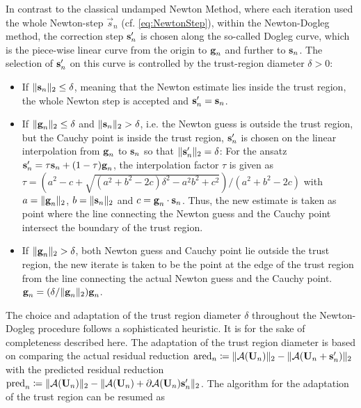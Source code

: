 In contrast to the classical undamped Newton Method, where each iteration used the whole Newton-step $\vec{s}_n$ (cf. \cref{eq:NewtonStep}), within the Newton-Dogleg method, the correction step  $\textbf{s}'_n$ is chosen along the so-called Dogleg curve, which is the piece-wise linear
curve from the origin to $\textbf{g}_n$ and further to $ \textbf{s}_n$. The selection of $\textbf{s}'_n$ on this curve is controlled by the trust-region diameter $\delta > 0$:
\begin{itemize}
	\item
	If $\|  \textbf{s}_n \|_2 \leq \delta$,  meaning that the Newton estimate lies inside the trust region, the whole Newton step is accepted and $ \textbf{s}'_n =  \textbf{s}_n$.	
	\item
	If  $\|  \textbf{g}_n \|_2 \leq \delta$ and $\|  \textbf{s}_n \|_2 > \delta$, i.e. the Newton guess is outside the trust region, but the Cauchy point is inside the trust region, 
	$\textbf{s}'_n$ is chosen on the linear interpolation from $\textbf{g}_n$ to $\textbf{s}_n$
	so that  $\|  \textbf{s}'_n \|_2 = \delta$:
	For the ansatz
	$\textbf{s}'_n = \tau \textbf{s}_n + (1-\tau) \textbf{g}_n$,
	the interpolation factor $\tau$ is given as
	$ \tau = (a^2 - c + \sqrt{(a^2 + b^2 - 2 c) \delta^2 - a^2 b^2 + c^2}) / (a^2 + b^2 - 2 c) $
	with $a = \| \textbf{g}_n \|_2$,  $b = \| \textbf{s}_n \|_2$ and $c = \textbf{g}_n \cdot \textbf{s}_n $. Thus, the new estimate is taken as point where the line connecting the Newton guess and the Cauchy point intersect the boundary of the trust region.
	
	\item 	If  $\|  \textbf{g}_n \|_2 > \delta$, both Newton guess and Cauchy point lie outside the trust region, the new iterate is taken to be the point  at  the edge of the trust region from the line connecting the actual Newton guess and the Cauchy point.
	$  \textbf{g}_n = (\delta / \|  \textbf{g}_n \|_2) \textbf{g}_n$.
\end{itemize}
The choice and adaptation of the trust region diameter $\delta$ throughout the Newton-Dogleg procedure follows a sophisticated heuristic. It is for the sake of completeness described here. The adaptation of the trust region diameter is based on comparing the actual residual reduction $\textrm{ared}_n \coloneqq \| \mathcal{A} (\textbf{U}_n) \|_2 - \| \mathcal{A} (\textbf{U}_n  + \textbf{s}'_{n} ) \|_2$ with the predicted residual reduction
$\textrm{pred}_n \coloneqq \| \mathcal{A} (\textbf{U}_n) \|_2 - \| \mathcal{A} (\textbf{U}_n )   + \partial \mathcal{A} (\textbf{U}_n ) \textbf{s}'_{n} \|_2$. The algorithm for the adaptation of the trust region can be resumed as
